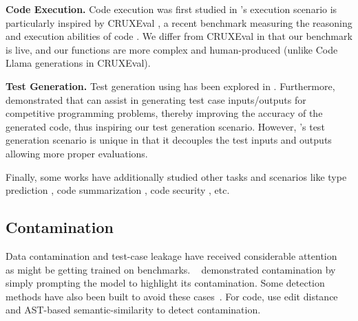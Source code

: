 \vspace{1pt}
\noindent \textbf{Code Execution.} 
Code execution was first studied in \citet{austin2021program, nye2021show}
\livecodebench{}'s execution scenario is particularly inspired by CRUXEval \citep{gu2024cruxeval}, a recent benchmark measuring the reasoning and execution abilities of code \llms{}. 
We differ from CRUXEval in that our benchmark is live, and our functions are more complex and human-produced (unlike Code Llama generations in CRUXEval).%

\vspace{1pt}
\noindent \textbf{Test Generation.} 
Test generation using \llms{} has been explored in \citep{yuan2023no, 10329992, tufano2022methods2test, watson2020learning}. 
Furthermore, \citet{chen2022codet} demonstrated that \llms{} can assist in generating test case inputs/outputs for competitive programming problems, thereby improving the accuracy of the generated code, thus inspiring our test generation scenario.
However, \livecodebench{}'s test generation scenario is unique in that it decouples the test inputs and outputs allowing more proper evaluations.

Finally, some works have additionally studied other tasks and scenarios like type prediction \citep{mir2022type4py, wei2023typet5, malik2019nl2type}, code summarization \citep{leclair2019neural, iyer2016summarizing, barone2017parallel, hasan2021codesc, alon2018code2seq}, code security \citep{liguori2022can, pearce2022asleep, tony2023llmseceval}, etc. 

\subsection{Contamination}
Data contamination and test-case leakage have received considerable attention ~\cite{yonatan2024proving,golchin2023time,weller2023according,roberts2024to} as \llms{} might be getting trained on benchmarks. 
~\citet{sainz2023chatgpt} demonstrated contamination by simply prompting the model to highlight its contamination. 
Some detection methods have also been built to avoid these cases~\citep{shi2023detecting,zhou2023don}. For code, \citet{riddell2024quantifying} use edit distance and AST-based semantic-similarity to detect contamination. 
